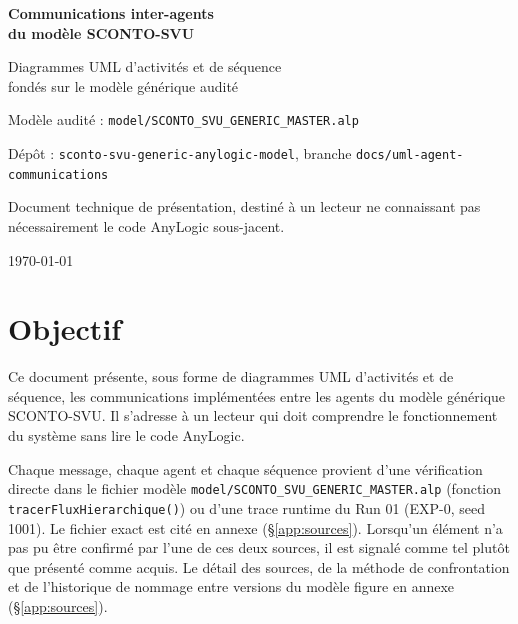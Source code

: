 \documentclass[11pt,a4paper]{article}
\newcommand{\code}[1]{\texttt{#1}}
\begin{document}
\begin{titlepage}
\centering
\vspace*{2cm}
{\Huge\bfseries Communications inter-agents\\[0.3cm] du modèle SCONTO-SVU\par}
\vspace{0.6cm}
{\Large Diagrammes UML d'activités et de séquence\\ fondés sur le modèle générique audité\par}
\vspace{1.5cm}
{\large Modèle audité : \code{model/\allowbreak{}SCONTO\_SVU\_GENERIC\_MASTER.alp}\par}
{\large Dépôt : \code{sconto-svu-generic-anylogic-model}, branche \code{docs/uml-agent-communications}\par}
\vspace{2cm}
{\normalsize Document technique de présentation, destiné à un lecteur ne connaissant pas nécessairement le code AnyLogic sous-jacent.\par}
\vfill
{\normalsize \today\par}
\end{titlepage}

\tableofcontents
\newpage

\section{Objectif}

Ce document présente, sous forme de diagrammes UML d'activités et de séquence, les communications implémentées entre les agents du modèle générique SCONTO-SVU. Il s'adresse à un lecteur qui doit comprendre le fonctionnement du système sans lire le code AnyLogic.

Chaque message, chaque agent et chaque séquence provient d'une vérification directe dans le fichier modèle \code{model/\allowbreak{}SCONTO\_SVU\_GENERIC\_MASTER.alp} (fonction \code{tracerFluxHierarchique()}) ou d'une trace runtime du Run 01 (EXP-0, seed 1001). Le fichier exact est cité en annexe (\S\ref{app:sources}). Lorsqu'un élément n'a pas pu être confirmé par l'une de ces deux sources, il est signalé comme tel plutôt que présenté comme acquis. Le détail des sources, de la méthode de confrontation et de l'historique de nommage entre versions du modèle figure en annexe (\S\ref{app:sources}).
\end{document}
